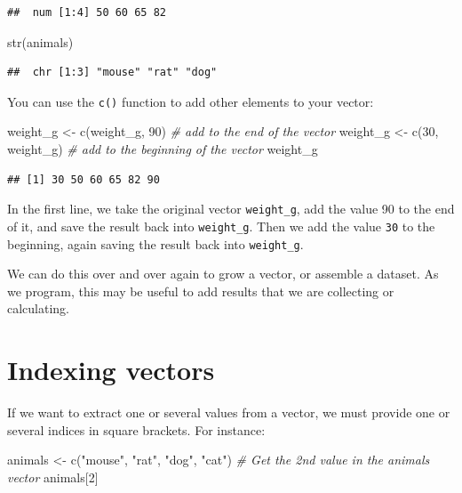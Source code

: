 \documentclass[
]{book}
\newenvironment{Shaded}{\begin{snugshade}}{\end{snugshade}}
\newcommand{\CommentTok}[1]{\textcolor[rgb]{0.56,0.35,0.01}{\textit{#1}}}
\newcommand{\DecValTok}[1]{\textcolor[rgb]{0.00,0.00,0.81}{#1}}
\newcommand{\FunctionTok}[1]{\textcolor[rgb]{0.00,0.00,0.00}{#1}}
\newcommand{\NormalTok}[1]{#1}
\newcommand{\OtherTok}[1]{\textcolor[rgb]{0.56,0.35,0.01}{#1}}
\newcommand{\StringTok}[1]{\textcolor[rgb]{0.31,0.60,0.02}{#1}}
\begin{document}
\begin{verbatim}
##  num [1:4] 50 60 65 82
\end{verbatim}

\begin{Shaded}
\begin{Highlighting}[]
\FunctionTok{str}\NormalTok{(animals)}
\end{Highlighting}
\end{Shaded}

\begin{verbatim}
##  chr [1:3] "mouse" "rat" "dog"
\end{verbatim}

You can use the \texttt{c()} function to add other elements to your vector:

\begin{Shaded}
\begin{Highlighting}[]
\NormalTok{weight\_g }\OtherTok{\textless{}{-}} \FunctionTok{c}\NormalTok{(weight\_g, }\DecValTok{90}\NormalTok{) }\CommentTok{\# add to the end of the vector}
\NormalTok{weight\_g }\OtherTok{\textless{}{-}} \FunctionTok{c}\NormalTok{(}\DecValTok{30}\NormalTok{, weight\_g) }\CommentTok{\# add to the beginning of the vector}
\NormalTok{weight\_g}
\end{Highlighting}
\end{Shaded}

\begin{verbatim}
## [1] 30 50 60 65 82 90
\end{verbatim}

In the first line, we take the original vector \texttt{weight\_g}, add the value 90 to the end of it, and save the result back into \texttt{weight\_g}. Then we add the value \texttt{30} to the beginning, again saving the result back into \texttt{weight\_g}.

We can do this over and over again to grow a vector, or assemble a dataset. As we program, this may be useful to add results that we are collecting or calculating.

\hypertarget{indexing-vectors}{%
\section{Indexing vectors}\label{indexing-vectors}}

If we want to extract one or several values from a vector, we must provide one or several indices in square brackets. For instance:

\begin{Shaded}
\begin{Highlighting}[]
\NormalTok{animals }\OtherTok{\textless{}{-}} \FunctionTok{c}\NormalTok{(}\StringTok{"mouse"}\NormalTok{, }\StringTok{"rat"}\NormalTok{, }\StringTok{"dog"}\NormalTok{, }\StringTok{"cat"}\NormalTok{)}
\CommentTok{\# Get the 2nd value in the animals vector}
\NormalTok{animals[}\DecValTok{2}\NormalTok{]}
\end{Highlighting}
\end{Shaded}
\end{document}
